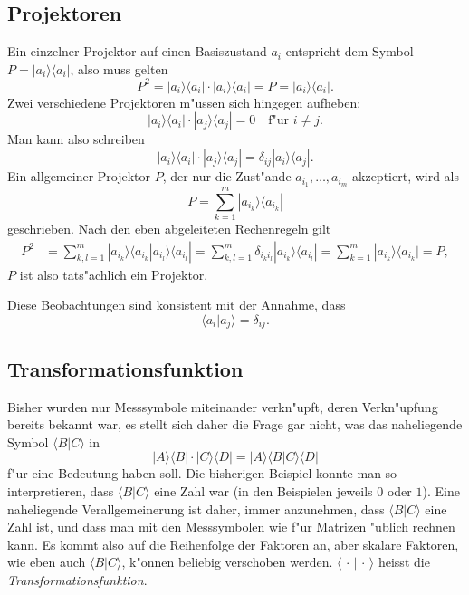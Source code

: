 \subsection{Projektoren}
%
Ein einzelner Projektor auf einen Basiszustand $a_i$ entspricht dem Symbol
$P= |a_i\rangle\langle a_i|$, also muss gelten
\[
P^2 = 
|a_i\rangle\langle a_i|
\cdot
|a_i\rangle\langle a_i|
=P
=
|a_i\rangle\langle a_i|.
\]
Zwei verschiedene Projektoren m"ussen sich hingegen aufheben:
\[
|a_i\rangle\langle a_i|
\cdot
|a_j\rangle\langle a_j|
=
0 \quad\text{f"ur $i\ne j$}.
\]
Man kann also schreiben
\[
|a_i\rangle\langle a_i|
\cdot
|a_j\rangle\langle a_j|
=\delta_{ij} |a_i\rangle\langle a_j|.
\]
Ein allgemeiner Projektor $P$, der nur die Zust"ande $a_{i_1},\dots ,a_{i_m}$
akzeptiert, wird als
\[
P = \sum_{k=1}^m |a_{i_k}\rangle \langle a_{i_k}|
\]
geschrieben.
Nach den eben abgeleiteten Rechenregeln gilt
\begin{align*}
P^2
&=
\sum_{k,l=1}^m |a_{i_k}\rangle\langle a_{i_k}|a_{i_l}\rangle\langle a_{i_l}|
=
\sum_{k,l=1}^m \delta_{i_ki_l}|a_{i_k}\rangle\langle a_{i_l}|
=
\sum_{k=1}^m |a_{i_k}\rangle\langle a_{i_k}| = P,
\end{align*}
$P$ ist also tats"achlich ein Projektor.

Diese Beobachtungen sind konsistent mit der Annahme, dass
\[
\langle a_i|a_j\rangle = \delta_{ij}.
\]

\subsection{Transformationsfunktion}
%
Bisher wurden nur Messsymbole miteinander verkn"upft, deren 
Verkn"upfung bereits bekannt war, es stellt sich daher die
Frage gar nicht, was das naheliegende Symbol $\langle B|C\rangle$
in
\[
|A\rangle\langle B|\cdot |C\rangle\langle D|
=
|A\rangle \langle B|C\rangle \langle D|
\]
f"ur eine Bedeutung haben soll. Die bisherigen Beispiel konnte
man so interpretieren, dass $\langle B|C\rangle$ eine Zahl war
(in den Beispielen jeweils $0$ oder $1$).
Eine naheliegende Verallgemeinerung ist daher, immer anzunehmen,
dass $\langle B|C\rangle$ eine Zahl ist, und dass man mit den
Messsymbolen wie f"ur Matrizen "ublich rechnen kann.
Es kommt also auf die Reihenfolge der Faktoren an, aber skalare
Faktoren, wie eben auch $\langle B|C\rangle$, k"onnen beliebig
verschoben werden.
$\langle \,\cdot\, |\,\cdot\, \rangle$ heisst die {\em Transformationsfunktion}.


